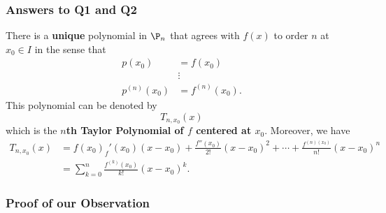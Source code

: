\subsubsection{Answers to Q1 and Q2}

There is a \textbf{unique} polynomial in \( {\P}_{n} \) that agrees with \( f(x) \) to order \( n  \) at \( {x}_{0} \in I  \) in the sense that 
\begin{align*}
    p({x}_{0}) &= f({x}_{0} ) \\
               &\vdots \\
    p^{(n)}({x}_{0}) &= f^{(n)}({x}_{0}).
\end{align*}
This polynomial can be denoted by 
\[  {T}_{n, {x}_{0}}  (x)\]
which is the \textbf{\( n \)th Taylor Polynomial of \( f  \) centered at \( {x}_{0} \)}. Moreover, we have   
\begin{align*}
    {T}_{n,{x}_{0}}(x)  &= f({x}_{0}) _ f'({x}_{0}) (x - {x}_{0}) + \frac{ f''({x}_{0}) }{ 2!  } (x - {x}_{0})^{2} + \cdots + \frac{ f^{(n)({x}_{0}) } }{ n!  } (x - {x}_{0})^{n}   \\
                        &= \sum_{ k= 0  }^{ n } \frac{ f^{(k)}({x}_{0}) }{ k !  }  (x - {x}_{0})^{k}.
\end{align*}

\subsubsection{Proof of our Observation}

